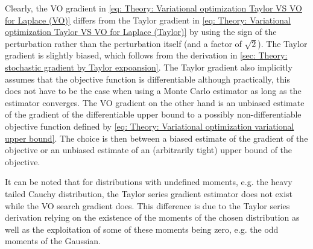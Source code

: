 Clearly, the \gls{VO} gradient in \eqref{eq: Theory: Variational optimization Taylor VS VO for Laplace (VO)} differs from the Taylor gradient in \eqref{eq: Theory: Variational optimization Taylor VS VO for Laplace (Taylor)} by using the sign of the perturbation rather than the perturbation itself (and a factor of $\sqrt{2}$). 
The Taylor gradient is slightly biased, which follows from the derivation in \autoref{sec: Theory: stochastic gradient by Taylor expoansion}.
The Taylor gradient also implicitly assumes that the objective function is differentiable although practically, this does not have to be the case when using a Monte Carlo estimator as long as the estimator converges. The \gls{VO} gradient on the other hand is an unbiased estimate of the gradient of the differentiable upper bound to a possibly non-differentiable objective function defined by \eqref{eq: Theory: Variational optimization variational upper bound}. The choice is then between a biased estimate of the gradient of the objective or an unbiased estimate of an (arbitrarily tight) upper bound of the objective.

It can be noted that for distributions with undefined moments, e.g. the heavy tailed Cauchy distribution, the Taylor series gradient estimator does not exist while the \gls{VO} search gradient does. This difference is due to the Taylor series derivation relying on the existence of the moments of the chosen distribution as well as the exploitation of some of these moments being zero, e.g. the odd moments of the Gaussian.



